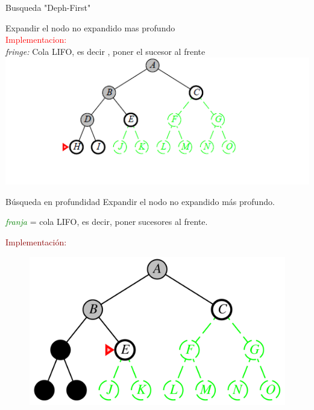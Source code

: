 \documentclass{beamer}
\theoremstyle{definition}
\theoremstyle{theorem}
\theoremstyle{remark}
\begin{document}
\begin{frame}{Busqueda "Deph-First"}
    
    Expandir el nodo no expandido mas profundo
    \\\textcolor{red}{\large{Implementacion:}}
    \\\qquad\qquad\textit{fringe:} Cola LIFO, es decir , poner el sucesor al frente
    \\
    \centering
    \includegraphics[scale=0.5]{47_image_cap3pag47.PNG}
    
\end{frame}


\begin{frame}{Búsqueda en profundidad}
Expandir el nodo no expandido más profundo.\\
\begin{center}
    \textit{\textcolor{Green}{franja}} = cola LIFO, es decir, poner sucesores al
    frente.\\
\end{center}{}

\textcolor{DarkRed}{Implementación:}
    \begin{figure}
        \includegraphics[scale=0.2]{48_chap3_pag48.png}
    \end{figure}
\end{frame}{}
\end{document}
